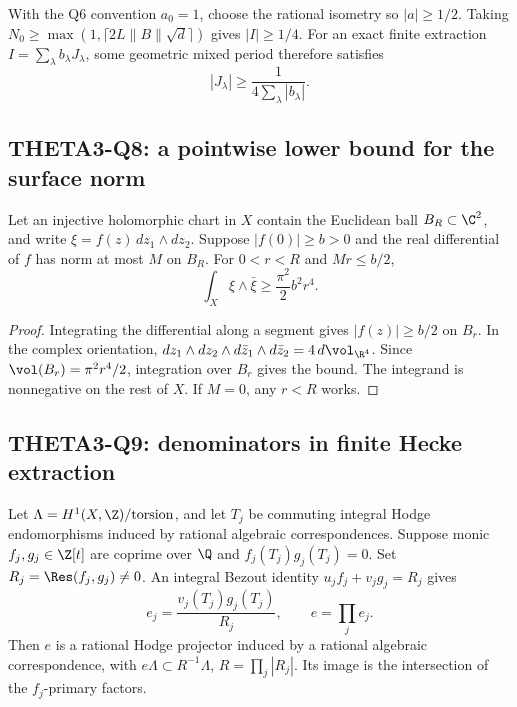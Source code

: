 With the Q6 convention $a_0=1$, choose the rational isometry so $|a|\geq1/2$. Taking
$N_0\geq\max(1,\lceil2L\|B\|\sqrt d\rceil)$ gives $|I|\geq1/4$. For an exact finite extraction $I=\sum_\lambda b_\lambda J_\lambda$, some geometric mixed period therefore satisfies
\begin{equation}\label{eq:quarter}
 |J_\lambda|\geq\frac1{4\sum_\lambda|b_\lambda|}.
\end{equation}

\subsection{THETA3-Q8: a pointwise lower bound for the surface norm}\label{Q8}
Let an injective holomorphic chart in $X$ contain the Euclidean ball $B_R\subset\C^2$, and write
$\xi=f(z)\,dz_1\wedge dz_2$. Suppose $|f(0)|\geq b>0$ and the real differential of $f$ has norm at most $M$ on $B_R$. For $0<r<R$ and $Mr\leq b/2$,
\begin{equation}\label{eq:local-norm}
 \int_X\xi\wedge\bar\xi\geq\frac{\pi^2}{2}b^2r^4.
\end{equation}
\begin{proof}
Integrating the differential along a segment gives $|f(z)|\geq b/2$ on $B_r$. In the complex orientation,
$dz_1\wedge dz_2\wedge d\bar z_1\wedge d\bar z_2=4\,d\vol_{\R^4}$.
Since $\vol(B_r)=\pi^2r^4/2$, integration over $B_r$ gives the bound. The integrand is nonnegative on the rest of $X$. If $M=0$, any $r<R$ works.
\end{proof}

\subsection{THETA3-Q9: denominators in finite Hecke extraction}\label{Q9}
Let $\Lambda=H^1(X,\Z)/\mathrm{torsion}$, and let $T_j$ be commuting integral Hodge endomorphisms induced by rational algebraic correspondences. Suppose monic $f_j,g_j\in\Z[t]$ are coprime over $\Q$ and
$f_j(T_j)g_j(T_j)=0$. Set $R_j=\Res(f_j,g_j)\ne0$. An integral Bezout identity
$u_jf_j+v_jg_j=R_j$ gives
\[
 e_j=\frac{v_j(T_j)g_j(T_j)}{R_j},\qquad e=\prod_j e_j.
\]
Then $e$ is a rational Hodge projector induced by a rational algebraic correspondence, with
$e\Lambda\subset R^{-1}\Lambda$, $R=\prod_j|R_j|$. Its image is the intersection of the $f_j$-primary factors.

